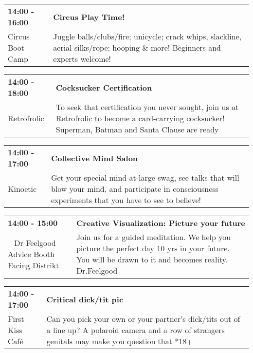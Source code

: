 \begin{tabular}{ p{1in} p{2.2in} }
    \textbf{14:00 - 16:00} & \textbf{Circus Play Time!} \\
    Circus Boot Camp \newline  & Juggle balls/clubs/fire; unicycle; crack whips, slackline, aerial silks/rope; hooping \& more! Beginners and experts welcome! \\
    \hline 
\end{tabular}
    
\begin{tabular}{ p{1in} p{2.2in} }
    \textbf{14:00 - 18:00} & \textbf{Cocksucker Certification} \\
    Retrofrolic \newline  & To seek that certification you never sought, join us at Retrofrolic to become a card-carrying cocksucker!  Superman, Batman and Santa Clause are ready \\
    \hline 
\end{tabular}
    
\begin{tabular}{ p{1in} p{2.2in} }
    \textbf{14:00 - 17:00} & \textbf{Collective Mind Salon} \\
    Kinoetic \newline  & Get your special mind-at-large swag, see talks that will blow your mind, and participate in consciousness experiments that you have to see to believe! \\
    \hline 
\end{tabular}
    
\begin{tabular}{ p{1in} p{2.2in} }
    \textbf{14:00 - 15:00} & \textbf{Creative Visualization: Picture your future} \\
    ~ \newline Dr Feelgood Advice Booth Facing Distrikt & Join us for a guided meditation. We help you picture the perfect day 10 yrs in your future. You will be drawn to it and becomes reality.
Dr.Feelgood \\
    \hline 
\end{tabular}
    
\begin{tabular}{ p{1in} p{2.2in} }
    \textbf{14:00 - 17:00} & \textbf{Critical dick/tit pic} \\
    First Kiss Caf\'e \newline  & Can you pick your own or your partner's dick/tits out of a line up?  A polaroid camera and a row of strangers genitals may make you question that *18+ \\
    \hline 
\end{tabular}
    
